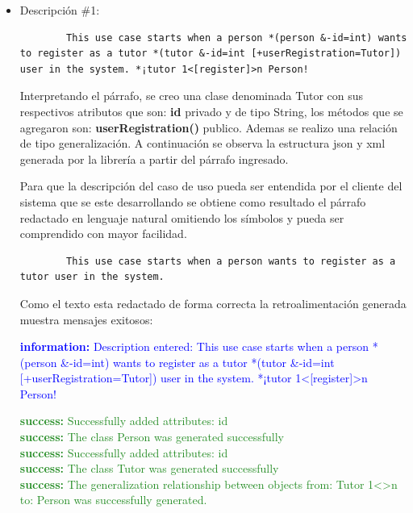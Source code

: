 \begin{itemize}
	\item Descripción \#1:
	\begin{lstlisting}
		This use case starts when a person *(person &-id=int) wants to register as a tutor *(tutor &-id=int [+userRegistration=Tutor]) user in the system. *¡tutor 1<[register]>n Person! \end{lstlisting}

	Interpretando el párrafo, se creo una clase denominada Tutor con sus respectivos atributos que son: \textbf{id} privado y de tipo String, los métodos que se agregaron son: \textbf{userRegistration()} publico. Ademas se realizo una relación de tipo generalización. A continuación se observa la estructura json y xml generada por la librería a partir del párrafo ingresado.
	
	
	
	
	Para que la descripción del caso de uso pueda ser entendida por el cliente del sistema que se este desarrollando se obtiene como resultado el párrafo redactado en lenguaje natural omitiendo los símbolos y pueda ser comprendido con mayor facilidad. 
	
	\begin{lstlisting}
		This use case starts when a person wants to register as a tutor user in the system.  \end{lstlisting}
	
	Como el texto esta redactado de forma correcta la retroalimentación generada muestra mensajes exitosos:
	
	\textcolor{blue}{\textbf{information:} Description entered: This use case starts when a person *(person \&-id=int) wants to register as a tutor *(tutor \&-id=int [+userRegistration=Tutor]) user in the system. *¡tutor 1<[register]>n Person!}
	
	\textcolor{ForestGreen}{
		\textbf{success:} Successfully added attributes: id \\
		\textbf{success:} The class Person was generated successfully \\
		\textbf{success:} Successfully added attributes: id \\
		\textbf{success:} The class Tutor was generated successfully \\
		\textbf{success:} The generalization relationship between objects from: Tutor 1<>n to: Person was successfully generated. }
	

\end{itemize}
